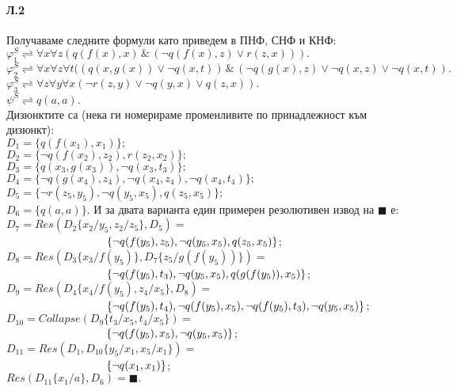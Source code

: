 \documentclass[12pt]{article}
\begin{document}
\paragraph{\hspace{0.5em} Л.2}
\begin{addmargin}[1em]{2em}
Получаваме следните формули като приведем в ПНФ, СНФ и КНФ: \\
$\varphi_1^S \rightleftharpoons \forall x \forall z (q(f(x), x)\,\&\,(\neg q(f(x), z)\lor r(z, x))). $ \\
$\varphi_2^S \rightleftharpoons \forall x \forall z \forall t((q(x,g(x))\lor \neg q(x,t))\,\&\,(\neg q(g(x),z) \lor \neg q(x, z) \lor \neg q(x, t)). $ \\
$\varphi_3^S \rightleftharpoons \forall z \forall y \forall x (\neg r(z,y) \lor \neg q(y,x) \lor q(z, x)). $ \\
$\psi^S \rightleftharpoons q(a,a).$ \\
Дизюнктите са (нека ги номерираме променливите по принадлежност към дизюнкт): \\
$D_1 = \{ q(f(x_1),x_1)\};$ \\
$D_2 = \{ \neg q(f(x_2),z_2), r(z_2, x_2)\};$ \\
$D_3 = \{ q(x_3, g(x_3)), \neg q(x_3, t_3)\};$ \\
$D_4 = \{ \neg q(g(x_4),z_4), \neg q(x_4, z_4), \neg q(x_4, t_4)\};$ \\
$D_5 = \{ \neg r(z_5, y_5), \neg q(y_5, x_5), q(z_5, x_5)\};$ \\
$D_6 = \{ q(a,a)\}.$ 
\vskip 0.1in
И за двата варианта един примерен резолютивен извод на $ \blacksquare $ е: \\
$ D_7 = Res(D_2\{x_2/y_5, z_2/z_5\}, D_5) = $\\$ \indent \indent \indent \indent \indent \indent \{ \neg q(f(y_5),z_5), \neg q(y_5, x_5), q(z_5, x_5) \}$; \\
$ D_8 = Res(D_3\{x_3/f(y_5)\}, D_7\{ z_5/g(f(y_5)) \}) = $\\$ \indent \indent \indent \indent \indent \indent \{ \neg q(f(y_5), t_3), \neg q(y_5, x_5), q(g(f(y_5)),x_5)\}$; \\
$ D_9 = Res(D_4\{x_4/f(y_5), z_4/x_5\}, D_8) = $\\$  \indent \indent \indent \indent \indent \indent \{ \neg q(f(y_5),t_4), \neg q(f(y_5),x_5), \neg q(f(y_5), t_3), \neg q(y_5, x_5)\}$;\\
$ D_{10} = Collapse(D_9\{t_3/x_5, t_4/x_5\}) = $\\$  \indent \indent \indent \indent \indent \indent\{\neg q(f(y_5), x_5), \neg q(y_5, x_5)\}$;\\
$ D_{11} = Res(D_1, D_{10}\{y_5/x_1, x_5/x_1 \}) = $\\$  \indent \indent \indent \indent \indent \indent  \{ \neg q(x_1, x_1) \}$;\\
$ Res(D_{11}\{x_1/a\}, D_6) = \blacksquare. $ \\
\end{addmargin}
\end{document}
